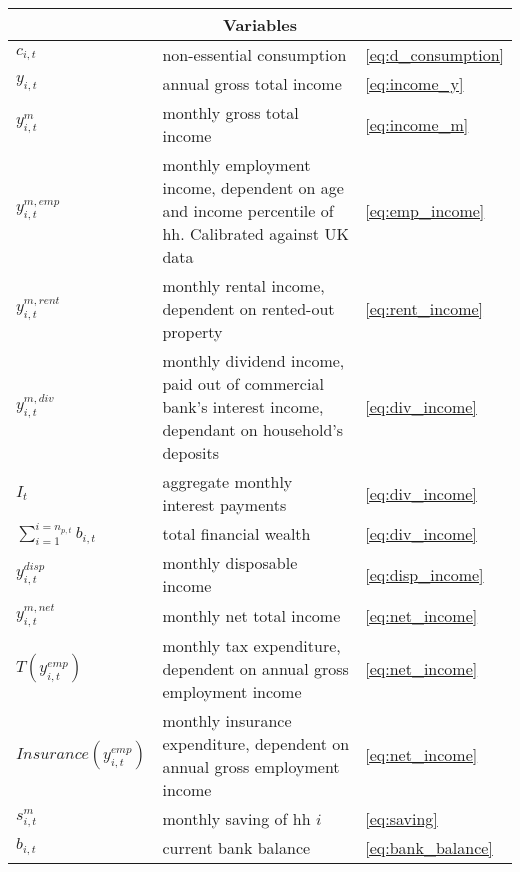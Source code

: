 \documentclass[]{article}
\begin{document}
\begin{longtable}{p{4cm} p{7cm}p{1cm}}

	\multicolumn{3}{c}{Variables} \\ 
	\hline 
	

	$c_{i,t}$ & non-essential consumption & \eqref{eq:d_consumption}\\ 
		
	$y_{i,t}$ & annual gross total income & \eqref{eq:income_y}\\ 
	
	$y^{m}_{i,t}$ & monthly gross total income & \eqref{eq:income_m}\\
	
	$y^{m, emp}_{i,t} $& monthly employment income, dependent on age and income percentile of hh. Calibrated against UK data &\eqref{eq:emp_income}\\
	
	$y^{m,rent}_{i,t} $& monthly rental income, dependent on rented-out property & \eqref{eq:rent_income}\\
	
	$y^{m,div}_{i,t} $& monthly dividend income, paid out of commercial bank's interest income, dependant on household's deposits & \eqref{eq:div_income}\\
	
	$I_{t} $& aggregate monthly interest payments & \eqref{eq:div_income}\\
	
	$\sum_{i=1}^{i=n_{p,t}} b_{i,t} $& total financial wealth & \eqref{eq:div_income}\\
	
	$y^{disp}_{i,t}$& monthly disposable income & \eqref{eq:disp_income}\\	
	
	$y^{m, net}_{i,t}$  & monthly net total income &  \eqref{eq:net_income}\\	
	
	$T(y^{emp}_{i,t})$& monthly tax expenditure, dependent on annual gross employment income & \eqref{eq:net_income}\\
	
	$Insurance(y^{emp}_{i,t})$& monthly insurance expenditure, dependent on annual gross employment income & \eqref{eq:net_income}\\
	
	$s^{m}_{i,t}$ & monthly saving of hh $i$&\eqref{eq:saving}\\ 
	
	$b_{i,t}$ & current bank balance  & \eqref{eq:bank_balance}\\
	

\end{longtable}
\end{document}
